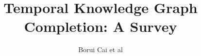 \documentclass[12pt]{article}
\begin{document}
\title{Temporal Knowledge Graph Completion: A Survey}
\author{Borui Cai et al}
\maketitle
\end{document}
